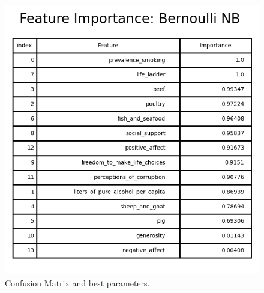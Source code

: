                 \begin{figure}[H]
                        \centering
                        \includegraphics[scale=1]{images/dm_featu_imp_bern_nb}
                        \caption{Confusion Matrix and best parameters.}
                        \label{fig:dm-bernoulli-nb-bp}
                \end{figure}

